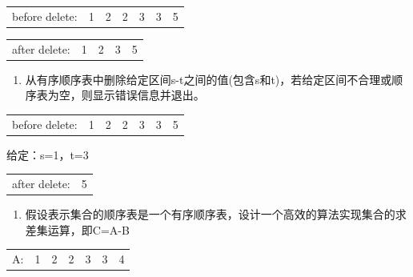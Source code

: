 \documentclass[lang=cn,newtx,10pt,scheme=chinese]{../../elegantbook}
\begin{document}
\begin{table}[!htbp]
\centering
\begin{tabular}{c|c|c|c|c|c|c|}
\cline{2-7}
before delete: & 1 & 2 & 2 & 3 & 3 & 5 \\
\cline{2-7}
\end{tabular}
\end{table}

\begin{table}[!htbp]
\centering
\begin{tabular}{c|c|c|c|c|}
\cline{2-5}
after delete: & 1 & 2 & 3 & 5 \\
\cline{2-5}
\end{tabular}
\end{table}

\begin{enumerate}
\def\labelenumi{\arabic{enumi}.}
\setcounter{enumi}{3}
\vspace{5cm}
\item
  
  从有序顺序表中删除给定区间s-t之间的值(包含s和t)，若给定区间不合理或顺序表为空，则显示错误信息并退出。
  
\end{enumerate}

\begin{table}[!htbp]
\centering
\begin{tabular}{c|c|c|c|c|c|c|}
\cline{2-7}
before delete: & 1 & 2 & 2 & 3 & 3 & 5 \\
\cline{2-7}
\end{tabular}
\end{table}

给定：s=1，t=3

\begin{table}[!htbp]
\centering
\begin{tabular}{c|c|}
\cline{2-2}
after delete: & 5 \\
\cline{2-2}
\end{tabular}
\end{table}
\begin{enumerate}
\def\labelenumi{\arabic{enumi}.}
\setcounter{enumi}{4}
\vspace{5cm}
\item
  
  假设表示集合的顺序表是一个有序顺序表，设计一个高效的算法实现集合的求差集运算，即C=A-B
  

  
\end{enumerate}

\begin{table}[!htbp]
\centering
\begin{tabular}{c|c|c|c|c|c|c|}
\cline{2-7}
A: & 1 & 2 & 2 & 3 & 3 & 4 \\
\cline{2-7}
\end{tabular}
\end{table}
\end{document}

